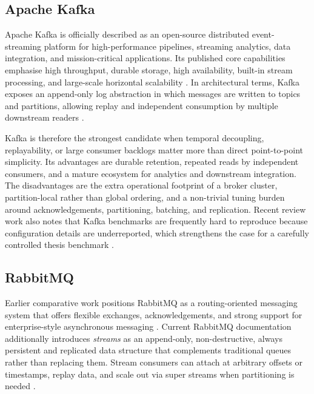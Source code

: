 \subsection{Apache Kafka}

Apache Kafka is officially described as an open-source distributed event-streaming platform for high-performance pipelines, streaming analytics, data integration, and mission-critical applications. Its published core capabilities emphasise high throughput, durable storage, high availability, built-in stream processing, and large-scale horizontal scalability \cite{kafka2026official}. In architectural terms, Kafka exposes an append-only log abstraction in which messages are written to topics and partitions, allowing replay and independent consumption by multiple downstream readers \cite{dobbelaere2017kafkarabbitmq}.

Kafka is therefore the strongest candidate when temporal decoupling, replayability, or large consumer backlogs matter more than direct point-to-point simplicity. Its advantages are durable retention, repeated reads by independent consumers, and a mature ecosystem for analytics and downstream integration. The disadvantages are the extra operational footprint of a broker cluster, partition-local rather than global ordering, and a non-trivial tuning burden around acknowledgements, partitioning, batching, and replication. Recent review work also notes that Kafka benchmarks are frequently hard to reproduce because configuration details are underreported, which strengthens the case for a carefully controlled thesis benchmark \cite{dobbelaere2017kafkarabbitmq,mohammad2025kafkapatterns,ciftci2025ipcmechanisms}.

\subsection{RabbitMQ}

Earlier comparative work positions RabbitMQ as a routing-oriented messaging system that offers flexible exchanges, acknowledgements, and strong support for enterprise-style asynchronous messaging \cite{dobbelaere2017kafkarabbitmq,sharvari2019messaging}. Current RabbitMQ documentation additionally introduces \emph{streams} as an append-only, non-destructive, always persistent and replicated data structure that complements traditional queues rather than replacing them. Stream consumers can attach at arbitrary offsets or timestamps, replay data, and scale out via super streams when partitioning is needed \cite{rabbitmq2026streams}.

